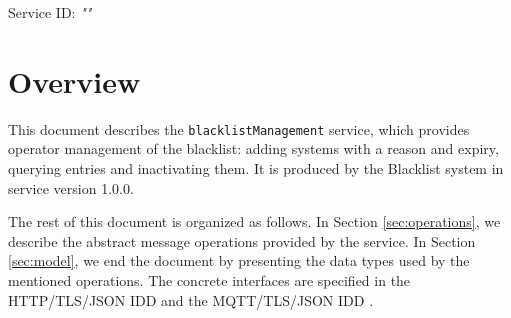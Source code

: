 \documentclass[a4paper]{arrowhead}
\begin{document}
\sloppy

\ArrowheadSetup

\begin{center}
  \vspace*{1cm}
  \huge{\arrowtitle}

  \vspace*{0.2cm}
  \LARGE{\arrowtype}
  \vspace*{1cm}

  \Large{Service ID: \textit{"\arrowid"}}

  \vspace*{\fill}


  \vspace*{1cm}
  \vspace*{\fill}

  \begin{abstract}
    This document describes the \texttt{blacklist\allowbreak{}Management} service, version 1.0.0, produced by the Blacklist support system of Arrowhead 5.2.2.
  \end{abstract}

  \vspace*{1cm}
\end{center}

\newpage

\tableofcontents
\newpage

\section{Overview}
\label{sec:overview}

This document describes the \texttt{blacklist\allowbreak{}Management} service, which provides operator management of the blacklist: adding systems with a reason and expiry, querying entries and inactivating them.
It is produced by the Blacklist system \cite{bl-sysd} in service version 1.0.0.

The rest of this document is organized as follows.
In Section \ref{sec:operations}, we describe the abstract message operations provided by the service.
In Section \ref{sec:model}, we end the document by presenting the data types used by the mentioned operations.
The concrete interfaces are specified in the HTTP/TLS/JSON IDD \cite{bl-blacklistManagement-http-idd} and the MQTT/TLS/JSON IDD \cite{bl-blacklistManagement-mqtt-idd}.
\end{document}
